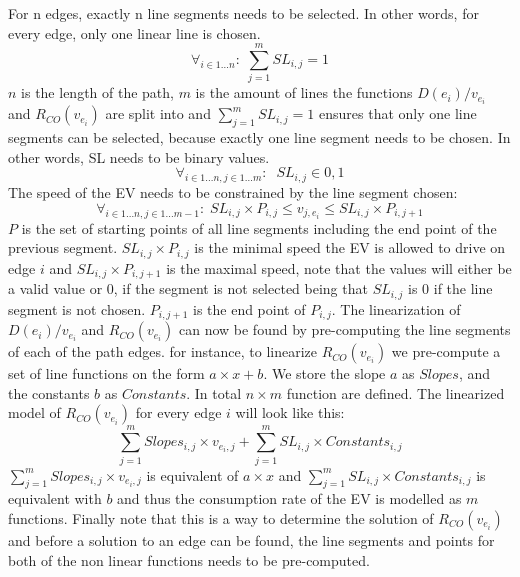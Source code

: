 For n edges, exactly n line segments needs to be selected. In other words, for every edge, only one linear line is chosen. 
\begin{equation*}
\forall_{i\in1 \dots n }:\; \sum_{j=1}^{m} SL_{i,j} = 1
\end{equation*}
$n$ is the length of the path, $m$ is the amount of lines the functions \( D(e_i)/v_{e_i} \) and $R_{CO}(v_{e_i})$ are split into and $\sum_{j=1}^{m} SL_{i,j} = 1$ ensures that only one line segments can be selected, because exactly one line segment needs to be chosen. In other words, SL needs to be binary values.
\begin{equation*}
\forall_{i\in1 \dots n, j \in 1 \dots m}: \; \; SL_{i,j} \in{0,1} 
\end{equation*}
The speed of the EV needs to be constrained by the line segment chosen:
\begin{equation*}
\forall_{i\in1 \dots n, j \in 1 \dots m-1}:\; SL_{i,j} \times P_{i,j}  \le  v_{j,e_i} \le SL_{i,j}\times P_{i,j+1}
\end{equation*}
$P$ is the set of starting points of all line segments including the end point of the previous segment. $SL_{i,j} \times P_{i,j}$ is the minimal speed the EV is allowed to drive on edge $i$ and $SL_{i,j}\times P_{i,j+1}$ is the maximal speed, note that the values will either be a valid value or $0$, if the segment is not selected being that $SL_{i,j}$ is $0$ if the line segment is not chosen. $P_{i,j+1}$ is the end point of $P_{i,j}$. 
The linearization of \( D(e_i)/v_{e_i} \) and $R_{CO}(v_{e_i})$ can now be found by pre-computing the line segments of each of the path edges. for instance, to linearize $R_{CO}(v_{e_i})$ we pre-compute a set of line functions on the form $a\times x+b$. We store the slope $a$ as $Slopes$, and the constants $b$ as $Constants$. In total $n \times m$ function are defined. The linearized model of $R_{CO}(v_{e_i})$ for every edge $i$ will look like this:
\begin{equation*}
\sum_{j=1}^{m} Slopes_{i,j}\times v_{e_i,j} + \sum_{j=1}^{m} SL_{i,j}\times Constants_{i,j} 
\end{equation*}
$\sum_{j=1}^{m} Slopes_{i,j}\times v_{e_i,j}$ is equivalent of $a\times x$ and $\sum_{j=1}^{m} SL_{i,j}\times Constants_{i,j}$ is equivalent with $b$ and thus the consumption rate of the EV is modelled as $m$ functions. 
Finally note that this is a way to determine the solution of $R_{CO}(v_{e_i})$ and before a solution to an edge can be found, the line segments and points for both of the non linear functions needs to be pre-computed. 
